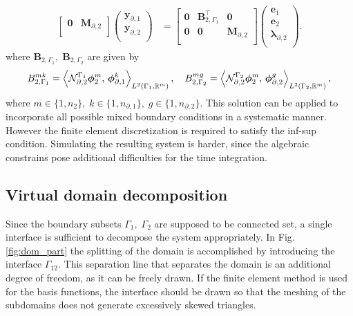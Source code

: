\begin{equation}
\begin{aligned}
\begin{bmatrix}
\mathbf{0} & \mathbf{M}_{\partial, 2} \\
\end{bmatrix}
\begin{pmatrix}
\mathbf{y}_{\partial, 1} \\
\mathbf{y}_{\partial, 2} \\
\end{pmatrix}
&= \begin{bmatrix}
\mathbf{0} & \mathbf{B}_{2, \Gamma_1}^\top & \mathbf{0} \\
\mathbf{0} & \mathbf{0} & \mathbf{M}_{\partial, 2} \\
\end{bmatrix}\begin{pmatrix}
\mathbf{e}_{1} \\
\mathbf{e}_{2} \\
{\bm{\lambda}}_{\partial, 2} \\
\end{pmatrix}.
\end{aligned}
\end{equation}
where $\mathbf{B}_{2, \Gamma_1}, \; \mathbf{B}_{2, \Gamma_2}$ are given by
\begin{equation}
{B}_{2, \Gamma_1}^{mk} = \inner[L^2(\Gamma_1, \mathbb{R}^m)]{\mathcal{N}_{\partial, 2}^{\Gamma_1}\bm{\phi}_{2}^m}{\bm{\phi}_{\partial, 1}^k}, \quad
{B}_{2, \Gamma_2}^{mg} = \inner[L^2(\Gamma_2, \mathbb{R}^m)]{\mathcal{N}_{\partial, 2}^{\Gamma_2}\bm{\phi}_{2}^m}{\bm{\phi}_{\partial, 2}^g}, 
\end{equation} 
where $m \in \{1,n_2\},\; k \in \{1,n_{\partial, 1}\},\; g \in \{1,n_{\partial, 2}\}$. This solution can be applied to incorporate all possible mixed boundary conditions in a systematic manner. However the finite element discretization is required to satisfy the inf-sup condition. Simulating the resulting system is harder, since the algebraic constrains pose additional difficulties for the time integration.

\subsection{Virtual domain decomposition}\label{sec:vdd}
Since the boundary subsets $\Gamma_1, \; \Gamma_2$ are supposed to be connected set, a single interface is sufficient to decompose the system appropriately. In Fig. \ref{fig:dom_part} the splitting of the domain is accomplished by introducing the interface $\Gamma_{12}$. This separation line that separates the domain is an additional degree of freedom, as it can be freely drawn. If the finite element method is used for the basis functions, the interface should be drawn so that the meshing of the subdomains does not generate excessively skewed triangles. 


